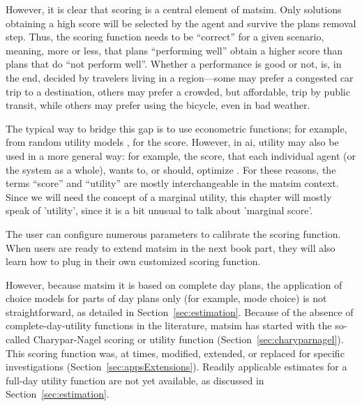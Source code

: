 However, it is clear that scoring is a central element of \gls{matsim}.  Only solutions obtaining a high score will be selected by the agent and survive the plans removal step.  Thus, the scoring function needs to be ``correct'' for a given scenario, meaning, more or less, that plans ``performing well'' obtain a higher score than plans that do ``not perform well''.  Whether a performance is good or not, is, in the end, decided by travelers living in a region---some may prefer a congested car trip to a destination, others may prefer a crowded, but affordable, trip by public transit, while others may prefer using the bicycle, even in bad weather.

The typical way to bridge this gap is to use econometric  functions; for example, from random utility models \citep[e.g.][]{BenAkivaLerman_1985,Train_2003}, for the score.  However, in \gls{ai}, utility may also be used in a more general way: for example, the \gls{score}, that each individual agent (or the system as a whole), wants to, or should, optimize \citep{RusselNorvig2010ArtificialIntelligence}.  For these reasons, the terms ``\gls{score}'' and ``\gls{utility}'' are mostly interchangeable in the \gls{matsim} context.  Since we will need the concept of a marginal utility, this chapter will mostly speak of 'utility', since it is a bit unusual to talk about 'marginal score'.

The user can configure numerous parameters to calibrate the
scoring function.
When users are ready to extend \gls{matsim} in the next book part, they will also learn how to plug in their own customized scoring function.

However, because \gls{matsim} it is based on complete day plans, the application of choice models for parts of day plans only (for example, mode choice) is not straightforward, as detailed in Section~\ref{sec:estimation}.
%
%
Because of the absence of complete-day-utility functions in the literature, \gls{matsim} has
started with the so-called Charypar-Nagel scoring or \gls{utility} function (Section~\ref{sec:charyparnagel}). This scoring function was, at times, modified, extended, or replaced for specific investigations (Section~\ref{sec:appsExtensions}). Readily applicable estimates for a full-day utility function are not yet available, as discussed in Section~\ref{sec:estimation}.

